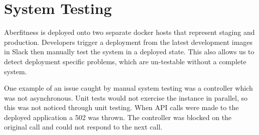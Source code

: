 \section{System Testing}
\par
Aberfitness is deployed onto two separate docker hosts that represent staging and production. Developers trigger a deployment from the latest development images in Slack then manually test the system in a deployed state. This also allows us to detect deployment specific problems, which are un-testable without a complete system.

\par
One example of an issue caught by manual system testing was a controller which was not asynchronous. Unit tests would not exercise the instance in parallel, so this was not noticed through unit testing. When API calls were made to the deployed application a 502 was thrown. The controller was blocked on the original call and could not respond to the next call.
